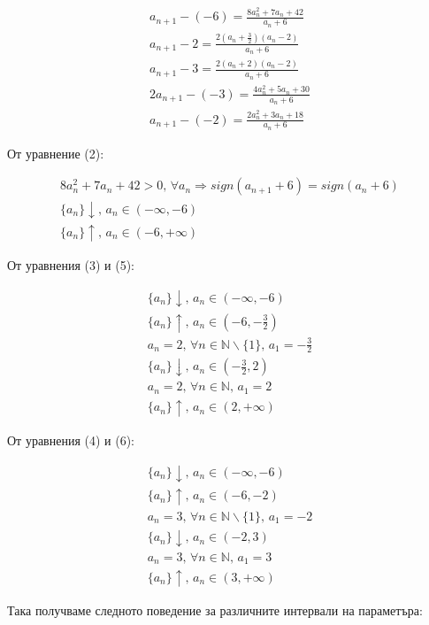 \documentclass{article}
\begin{document}
\begin{gather}
    a_{n+1} - (-6) = \frac{8a_n^2 + 7a_n + 42}{a_n + 6} \\
    a_{n+1} - 2 = \frac{2(a_n + \frac{3}{2})(a_n - 2)}{a_n + 6} \\
    a_{n+1} - 3 = \frac{2(a_n + 2)(a_n - 2)}{a_n + 6} \\
    2a_{n+1} - (-3) = \frac{4a_n^2 + 5a_n + 30}{a_n + 6} \\
    a_{n+1} - (-2) = \frac{2a_n^2 + 3a_n + 18}{a_n + 6}
\end{gather}

От уравнение (2):

\begin{gather*}
    8a_n^2 + 7a_n + 42 > 0,\, \forall a_n \Longrightarrow sign(a_{n+1} + 6) = sign(a_n + 6) \\
    \{a_n\}\downarrow ,\, a_n \in (-\infty, -6) \\
    \{a_n\}\uparrow ,\, a_n \in (-6, +\infty)
\end{gather*}

От уравнения (3) и (5):

\begin{gather*}
    \{a_n\}\downarrow ,\, a_n \in (-\infty, -6) \\
    \{a_n\}\uparrow ,\, a_n \in \left(-6, -\frac{3}{2}\right) \\
    a_n = 2,\, \forall n \in \mathbb{N} \backslash \{1\},\, a_1 = -\frac{3}{2} \\
    \{a_n\}\downarrow ,\, a_n \in \left(-\frac{3}{2}, 2\right) \\
    a_n = 2,\, \forall n \in \mathbb{N},\, a_1 = 2 \\
    \{a_n\}\uparrow ,\, a_n \in (2, +\infty)
\end{gather*}

От уравнения (4) и (6):

\begin{gather*}
    \{a_n\}\downarrow ,\, a_n \in (-\infty, -6) \\
    \{a_n\}\uparrow ,\, a_n \in (-6, -2) \\
    a_n = 3,\, \forall n \in \mathbb{N} \backslash \{1\},\, a_1 = -2 \\
    \{a_n\}\downarrow ,\, a_n \in (-2, 3) \\
    a_n = 3,\, \forall n \in \mathbb{N},\, a_1 = 3 \\
    \{a_n\}\uparrow ,\, a_n \in (3, +\infty)
\end{gather*}

Така получваме следното поведение за различните интервали на параметъра:
\end{document}
